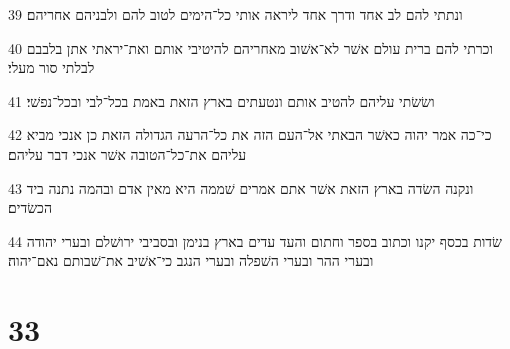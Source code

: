 \par 39 ונתתי להם לב אחד ודרך אחד ליראה אותי כל־הימים לטוב להם ולבניהם אחריהם׃
\par 40 וכרתי להם ברית עולם אשׁר לא־אשׁוב מאחריהם להיטיבי אותם ואת־יראתי אתן בלבבם לבלתי סור מעלי׃
\par 41 ושׂשׂתי עליהם להטיב אותם ונטעתים בארץ הזאת באמת בכל־לבי ובכל־נפשׁי׃
\par 42 כי־כה אמר יהוה כאשׁר הבאתי אל־העם הזה את כל־הרעה הגדולה הזאת כן אנכי מביא עליהם את־כל־הטובה אשׁר אנכי דבר עליהם׃
\par 43 ונקנה השׂדה בארץ הזאת אשׁר אתם אמרים שׁממה היא מאין אדם ובהמה נתנה ביד הכשׂדים׃
\par 44 שׂדות בכסף יקנו וכתוב בספר וחתום והעד עדים בארץ בנימן ובסביבי ירושׁלם ובערי יהודה ובערי ההר ובערי השׁפלה ובערי הנגב כי־אשׁיב את־שׁבותם נאם־יהוה׃

\chapter{33}

